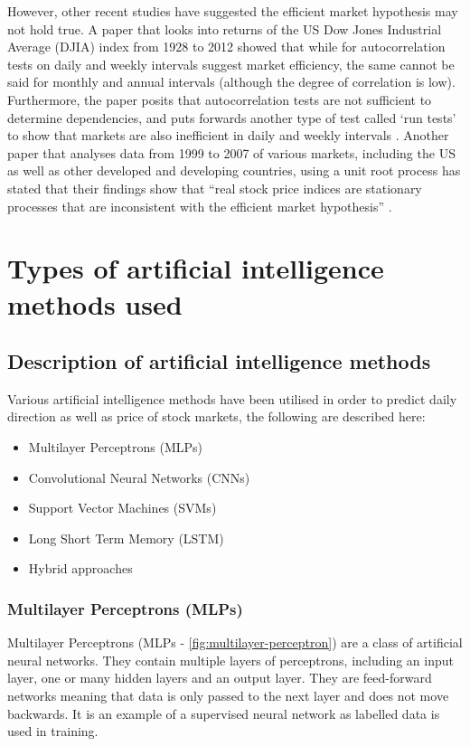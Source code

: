 However, other recent studies have suggested the efficient market hypothesis may not hold true. A paper that looks into returns of the US Dow Jones Industrial Average (DJIA) index from 1928 to 2012 showed that while for autocorrelation tests on daily and weekly intervals suggest market efficiency, the same cannot be said for monthly and annual intervals (although the degree of correlation is low). Furthermore, the paper posits that autocorrelation tests are not sufficient to determine dependencies, and puts forwards another type of test called `run tests' to show that markets are also inefficient in daily and weekly intervals \parencite{sewell_2012}. Another paper that analyses data from 1999 to 2007 of various markets, including the US as well as other developed and developing countries, using a unit root process has stated that their findings show that ``real stock price indices are stationary processes that are inconsistent with the efficient market hypothesis'' \parencite[1]{LEE201049}.




\section{Types of artificial intelligence methods used}

\subsection{Description of artificial intelligence methods}
Various artificial intelligence methods have been utilised in order to predict daily direction as well
as price of stock markets, the following are described here:
\begin{itemize}
    \item Multilayer Perceptrons (MLPs)
    \item Convolutional Neural Networks (CNNs)
    \item Support Vector Machines (SVMs)
    \item Long Short Term Memory (LSTM)
    \item Hybrid approaches
\end{itemize}

\subsubsection{Multilayer Perceptrons (MLPs)}
Multilayer Perceptrons (MLPs - \autoref{fig:multilayer-perceptron}) are a class of artificial neural networks. They contain multiple layers
of perceptrons, including an input layer, one or many hidden layers and an output layer. They are
feed-forward networks meaning that data is only passed to the next layer and does not move backwards.
It is an example of a supervised neural network as labelled data is used in training.

